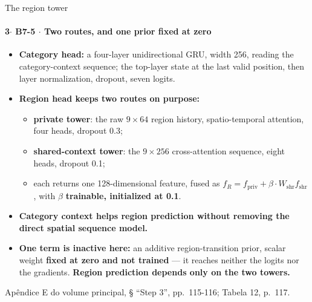 \documentclass{beamer}
\begin{document}
\begin{frame}[noframenumbering]{The region tower}
    \framesubtitle{\normalsize 3$\cdot$ \textbf{B7-5} $\cdot$ Two routes, and one prior fixed at zero}
    \hypertarget{b75}{}
    \small\begin{itemize}\setlength{\itemsep}{0pt}\setlength{\parskip}{0pt}
        \item \textbf{Category head:} a four-layer unidirectional GRU, width 256, reading the category-context sequence; the top-layer state at the last valid position, then layer normalization, dropout, seven logits.
        \item \textbf{Region head keeps two routes on purpose:}
        \begin{itemize}\footnotesize\setlength{\itemsep}{0pt}\setlength{\parskip}{0pt}
            \item \textbf{private tower}: the raw $9\times64$ region history, spatio-temporal attention, four heads, dropout 0.3;
            \item \textbf{shared-context tower}: the $9\times256$ cross-attention sequence, eight heads, dropout 0.1;
            \item each returns one 128-dimensional feature, fused as $f_R = f_{\mathrm{priv}} + \beta \cdot W_{\mathrm{shr}} f_{\mathrm{shr}}$, with $\beta$ \textbf{trainable, initialized at 0.1}.
        \end{itemize}
        \item \textbf{Category context helps region prediction without removing the direct spatial sequence model.}
        \item \textbf{One term is inactive here:} an additive region-transition prior, scalar weight \textbf{fixed at zero and not trained} --- it reaches neither the logits nor the gradients. \textbf{Region prediction depends only on the two towers.}
    \end{itemize}
    \vfill
    {\scriptsize
    \begin{minipage}[b]{0.775\linewidth}\raggedright\textcolor{black!70}{Apêndice E do volume principal, § ``Step 3'', pp.~115-116; Tabela 12, p.~117.}\end{minipage}\hfill
    \begin{minipage}[b]{0.20\linewidth}\raggedleft \hyperlink{b0}{}\end{minipage}}
\end{frame}
\end{document}
